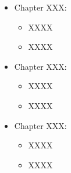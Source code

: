 \begin{itemize}
\item Chapter XXX: 
	\begin{itemize}
		\item XXXX
		\item XXXX
	\end{itemize}
\item Chapter XXX: 
	\begin{itemize}
		\item XXXX
		\item XXXX
	\end{itemize}
\item Chapter XXX: 
	\begin{itemize}
		\item XXXX
		\item XXXX
	\end{itemize}
\end{itemize}

